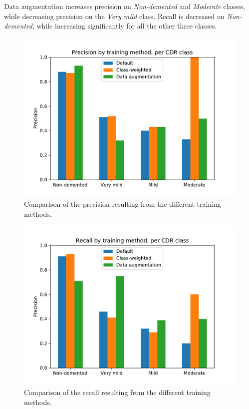 \documentclass{kththesis}
\begin{document}
Data augmentation increases precision on \textit{Non-demented} and \textit{Moderate} classes, while decreasing precision on the \textit{Very mild} class. Recall is decreased on \textit{Non-demented}, while increasing significantly for all the other three classes.

\begin{figure}[H]
  \centering
  \includegraphics[width=0.8\linewidth]{img/precision_comparison.pdf}
  \caption{Comparison of the precision resulting from the different training methods.} \label{fig:precision_comparison}
\end{figure}
\begin{figure}[H]
  \centering
  \includegraphics[width=0.8\linewidth]{img/recall_comparison.pdf}
  \caption{Comparison of the recall resulting from the different training methods.} \label{fig:recall_comparison}
\end{figure}
\end{document}
